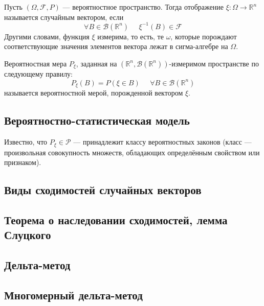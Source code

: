 \begin{definition}
    Пусть $(\Omega, \mathcal{F}, P)$ --- вероятностное пространство. 
    Тогда отображение $\xi : \Omega \to \mathbb{R}^n$ называется случайным вектором, если
    \begin{equation}
        \forall B \in \mathcal{B} (\mathbb{R}^n) \; \; \; \; \; \xi^{-1} (B) \in \mathcal{F}
    \end{equation}
Другими словами, функция $\xi$ измерима, то есть, те $\omega$, которые порождают соответствующие значения элементов вектора лежат в сигма-алгебре на $\Omega$.
\end{definition}

\begin{definition}
    Вероятностная мера $P_\xi$, заданная на $(\mathbb{R}^n, \mathcal{B}(\mathbb{R}^n))$-измеримом пространстве по следующему правилу:
    \begin{equation}
        P_\xi(B) = P(\xi \in B) \; \; \; \; \; \forall B \in \mathcal{B}(\mathbb{R}^n)
    \end{equation}
    называется вероятностной мерой, порожденной вектором $\xi$.
\end{definition}

\subsection{Вероятностно-статистическая модель}

Известно, что $P_\xi \in \mathcal{P}$ --- принадлежит классу вероятностных законов (класс --- произвольная совокупность множеств, обладающих определённым свойством или признаком).

\subsection{Виды сходимостей случайных векторов}

\subsection{Теорема о наследовании сходимостей, лемма Слуцкого}

\subsection{Дельта-метод}

\subsection{Многомерный дельта-метод}

\newpage